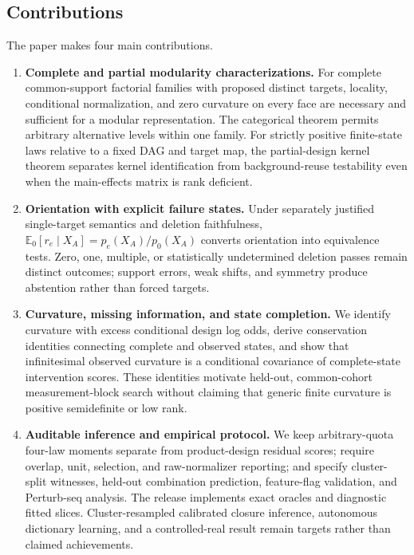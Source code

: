 \documentclass[11pt]{article}
\newcommand{\E}{\mathbb{E}}
\begin{document}
\subsection{Contributions}

The paper makes four main contributions.

\begin{enumerate}
\item \textbf{Complete and partial modularity characterizations.}  For complete common-support factorial families with proposed distinct targets, locality, conditional normalization, and zero curvature on every face are necessary and sufficient for a modular representation.  The categorical theorem permits arbitrary alternative levels within one family.  For strictly positive finite-state laws relative to a fixed DAG and target map, the partial-design kernel theorem separates kernel identification from background-reuse testability even when the main-effects matrix is rank deficient.

\item \textbf{Orientation with explicit failure states.}  Under separately justified single-target semantics and deletion faithfulness, \(\E_0[r_e\mid X_A]=p_e(X_A)/p_0(X_A)\) converts orientation into equivalence tests.  Zero, one, multiple, or statistically undetermined deletion passes remain distinct outcomes; support errors, weak shifts, and symmetry produce abstention rather than forced targets.

\item \textbf{Curvature, missing information, and state completion.}  We identify curvature with excess conditional design log odds, derive conservation identities connecting complete and observed states, and show that infinitesimal observed curvature is a conditional covariance of complete-state intervention scores.  These identities motivate held-out, common-cohort measurement-block search without claiming that generic finite curvature is positive semidefinite or low rank.

\item \textbf{Auditable inference and empirical protocol.}  We keep arbitrary-quota four-law moments separate from product-design residual scores; require overlap, unit, selection, and raw-normalizer reporting; and specify cluster-split witnesses, held-out combination prediction, feature-flag validation, and Perturb-seq analysis.  The release implements exact oracles and diagnostic fitted slices.  Cluster-resampled calibrated closure inference, autonomous dictionary learning, and a controlled-real result remain targets rather than claimed achievements.
\end{enumerate}
\end{document}
